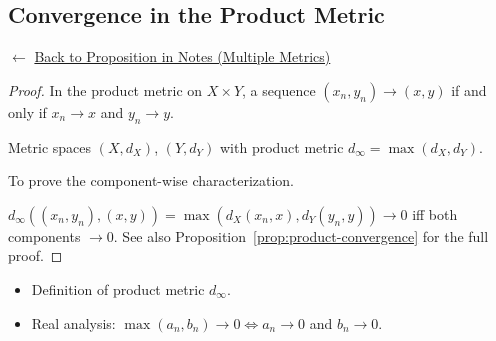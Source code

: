 
\subsection*{Convergence in the Product Metric}
\label{prf:product-convergence-multiple-metrics}

\begin{remark*}[Return]
$\leftarrow$ \hyperref[prop:product-convergence]{Back to Proposition in Notes
(Multiple Metrics)}
\end{remark*}

\begin{proof}
\Claim In the product metric on $X \times Y$, a sequence
$(x_n, y_n) \to (x, y)$ if and only if $x_n \to x$ and $y_n \to y$.

\Given Metric spaces $(X, d_X)$, $(Y, d_Y)$ with product metric
$d_\infty = \max(d_X, d_Y)$.

\Goal To prove the component-wise characterization.

\Strategy $d_\infty((x_n,y_n),(x,y)) = \max(d_X(x_n,x), d_Y(y_n,y)) \to 0$
iff both components $\to 0$.
See also Proposition~\ref{prop:product-convergence} for the full proof.


\end{proof}

\begin{remark*}[Dependencies]
\begin{itemize}
  \item Definition of product metric $d_\infty$.
  \item Real analysis: $\max(a_n, b_n) \to 0 \iff a_n \to 0$ and $b_n \to 0$.
\end{itemize}
\end{remark*}
